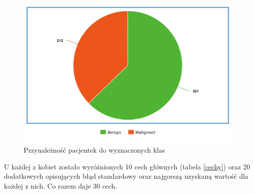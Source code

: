 \documentclass[12pt]{article}
\begin{document}
\begin{figure}[H]
	\centering
		\includegraphics[scale=0.6]{images/pie_chart.png}
	\caption{Przynależność pacjentek do wyznaczonych klas}
	\label{przynaleznosc_pacjentek}
\end{figure}

\indent U każdej z kobiet zostało wyróżnionych 10 cech głównych (tabela \ref{cechy}) oraz 20 dodatkowych opisujących błąd standardowy oraz najgorszą uzyskaną wartość dla każdej z nich. Co razem daje 30 cech. 
\newline
\end{document}
